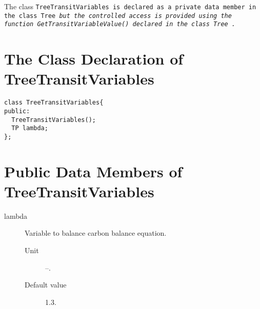 The class \tt TreeTransitVariables \rm is declared as a private data
member in the class \tt Tree \it but the controlled access is provided
using the function \tt GetTransitVariableValue() \rm declared in the
class \tt Tree \rm.  

\section{The Class Declaration of TreeTransitVariables}
\begin{verbatim}
class TreeTransitVariables{
public:
  TreeTransitVariables();
  TP lambda;        
};
\end{verbatim}

\section{Public Data Members of TreeTransitVariables}
  \begin{description}
    \item[lambda] Variable to balance carbon balance equation.
      \begin{description}
        \item[Unit] --.
        \item[Default value] 1.3.
      \end{description}
 \end{description}









